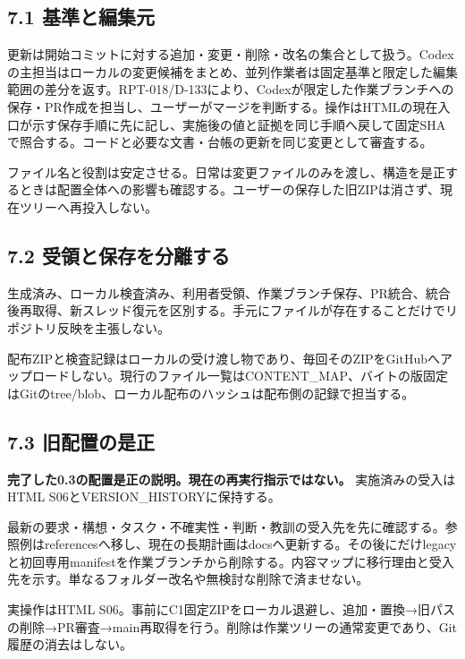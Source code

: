 \documentclass[11pt,a4paper]{article}
\begin{document}
\subsection{7.1
基準と編集元}\label{ux57faux6e96ux3068ux7de8ux96c6ux5143}

更新は開始コミットに対する追加・変更・削除・改名の集合として扱う。Codexの主担当はローカルの変更候補をまとめ、並列作業者は固定基準と限定した編集範囲の差分を返す。RPT-018/D-133により、Codexが限定した作業ブランチへの保存・PR作成を担当し、ユーザーがマージを判断する。操作はHTMLの現在入口が示す保存手順に先に記し、実施後の値と証拠を同じ手順へ戻して固定SHAで照合する。コードと必要な文書・台帳の更新を同じ変更として審査する。

ファイル名と役割は安定させる。日常は変更ファイルのみを渡し、構造を是正するときは配置全体への影響も確認する。ユーザーの保存した旧ZIPは消さず、現在ツリーへ再投入しない。

\subsection{7.2
受領と保存を分離する}\label{ux53d7ux9818ux3068ux4fddux5b58ux3092ux5206ux96e2ux3059ux308b}

生成済み、ローカル検査済み、利用者受領、作業ブランチ保存、PR統合、統合後再取得、新スレッド復元を区別する。手元にファイルが存在することだけでリポジトリ反映を主張しない。

配布ZIPと検査記録はローカルの受け渡し物であり、毎回そのZIPをGitHubへアップロードしない。現行のファイル一覧はCONTENT\_MAP、バイトの版固定はGitのtree/blob、ローカル配布のハッシュは配布側の記録で担当する。

\subsection{7.3
旧配置の是正}\label{ux65e7ux914dux7f6eux306eux662fux6b63}

\textbf{完了した0.3の配置是正の説明。現在の再実行指示ではない。}
実施済みの受入はHTML S06とVERSION\_HISTORYに保持する。

最新の要求・構想・タスク・不確実性・判断・教訓の受入先を先に確認する。参照例はreferencesへ移し、現在の長期計画はdocsへ更新する。その後にだけlegacyと初回専用manifestを作業ブランチから削除する。内容マップに移行理由と受入先を示す。単なるフォルダー改名や無検討な削除で済ませない。

実操作はHTML
S06。事前にC1固定ZIPをローカル退避し、追加・置換→旧パスの削除→PR審査→main再取得を行う。削除は作業ツリーの通常変更であり、Git履歴の消去はしない。
\end{document}
